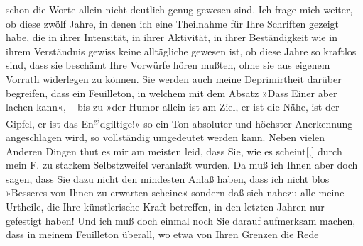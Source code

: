 \begin{ledgroupsized}[t]{13cm}
               schon die Worte allein nicht deutlich genug gewesen sind. Ich frage mich weiter, ob
               diese zwölf Jahre, in denen ich eine Theilnahme für Ihre Schriften gezeigt habe, die
               in ihrer Intensität, in ihrer Aktivität, in ihrer Beständigkeit wie in ihrem
               Verständnis gewiss keine alltägliche gewesen ist, ob diese Jahre so kraftlos sind,
               dass sie beschämt Ihre Vorwürfe hören mußten, ohne sie aus eigenem Vorrath widerlegen
               zu können.\pend
           \pstart
           Sie werden auch meine Deprimirtheit darüber begreifen, dass ein Feuilleton, in welchem mit dem Absatz »Dass Einer aber lachen kann«, –
               bis zu »der Humor allein ist am
                  Ziel, er ist die Nähe, ist der Gipfel, er ist das En\substVorne{}\textsuperscript{gi}\substDazwischen{}dg\substHinten{}iltige!« so ein Ton absoluter und höchster Anerkennung angeschlagen
               wird, so vollständig umgedeutet werden kann.\pend
           \pstart
           Neben vielen Anderen Dingen thut es mir am meisten leid, dass Sie, wie es
                  scheint{[},{]} durch mein F. zu starkem Selbstzweifel veranlaßt wurden. Da muß ich
               Ihnen aber doch sagen, dass Sie \uline{dazu} nicht den
               mindesten Anlaß haben, dass ich nicht blos »Besseres von Ihnen zu erwarten scheine«
               sondern daß sich nahezu alle meine Urtheile, die Ihre künstlerische Kraft betreffen,
               in den letzten Jahren nur gefestigt haben! Und ich muß {\pb}doch einmal noch Sie darauf
               aufmerksam machen, dass in meinem Feuilleton überall, wo etwa von Ihren Grenzen die Rede

\end{ledgroupsized}
